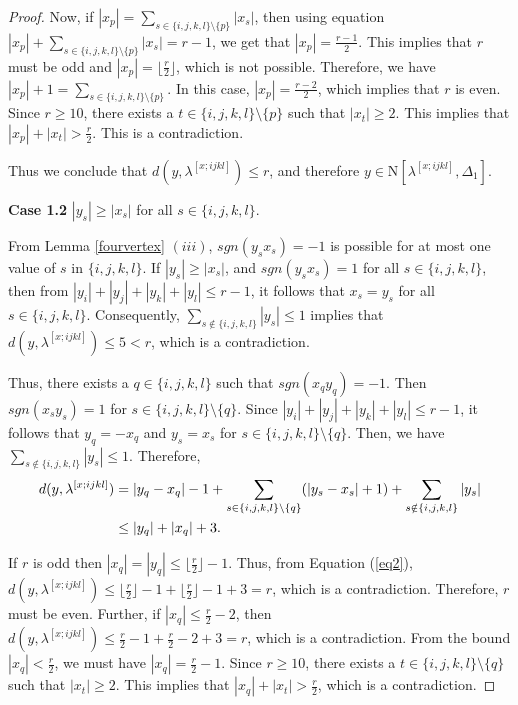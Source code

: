 \documentclass{amsart}
\theoremstyle{definition}
\theoremstyle{remark}
\numberwithin{equation}{section}
\newcommand{\D}{\Delta}
\newcommand{\f}{\lfloor\frac{r}{2}\rfloor}
\def\n{{\mathrm{N}}}
\begin{document}
\begin{proof}
	Now, if $|x_p|=\sum_{s \in \{i, j, k, l\}\setminus \{p\}} |x_s|$, then using equation $|x_p|+\sum_{s \in \{i, j, k, l\}\setminus \{p\}} |x_s| =r-1$, we get that $|x_p|=\frac{r-1}{2}$. This implies that $r$ must be odd and $|x_p|=\f$, which is not possible. 
	Therefore, we have $|x_p|+1=\sum_{s \in \{i, j, k, l\}\setminus \{p\}}$. In this case, $|x_p|=\frac{r-2}{2}$, which implies that $r$ is even. Since $r\geq 10$, there exists a $t\in \{i, j, k, l\}\setminus \{p\}$ such that $|x_t|\geq 2$. This implies that $|x_p|+|x_t|>\frac{r}{2}$. This is a contradiction.
	
	Thus we conclude that $d(y, \lambda^{[x;ijkl]}) \leq r$, and therefore $y \in \n[\lambda^{[x;ijkl]}, \D_1]$.
	

    \smallskip
	\noindent 
	\textbf{Case 1.2} $|y_s|\geq |x_s|$ for all $s\in\{i,j,k,l\}$. 
	
	
	From Lemma \ref{fourvertex} $(iii)$, $sgn(y_sx_s)=-1$ is possible for at most one value of $s$ in $\{i,j,k,l\}$. 
	If $|y_s|\geq |x_s|$, and $sgn(y_sx_s)=1$ for all $s\in \{i,j,k, l\}$, then from $|y_i|+|y_j|+|y_k|+|y_l|\leq r-1$, it follows that $x_s=y_s$ for all $s\in \{i,j,k,l\}$. Consequently, $\sum_{s\notin\{i,j,k,l\}}|y_s|\leq 1$ implies that $d(y,\lambda^{[x;ijkl]})\leq 5<r$, which is a contradiction.  
	
	Thus, there exists a $q\in\{i,j,k,l\}$ such that $sgn(x_qy_q)=-1$. Then $sgn(x_sy_s)=1$ for $s\in\{i,j,k,l\}\setminus\{q\}$. Since $|y_i|+|y_j|+|y_k|+|y_l|\leq r-1$, it follows that $y_q=-x_q$ and $y_s=x_s$ for $s\in\{i,j,k,l\}\setminus\{q\}$. Then, we have $\sum_{s\notin\{i,j,k,l\}}|y_s|\leq 1$. Therefore, 
	\begin{align}
		d(y,\lambda^{[x;ijkl]})&=|y_q-x_q|-1+\sum_{s\in\{i,j,k,l\}\setminus\{q\}}(|y_s-x_s|+1)+\sum_{s\notin\{i,j,k,l\}}|y_s| \notag
		\\
		&\leq |y_q|+|x_q|+3. \label{eq2}
	\end{align}
	
	If $r$ is odd then $|x_q|=|y_q|\leq \f-1$. Thus, from Equation (\ref{eq2}),
	$d(y,\lambda^{[x;ijkl]})\leq \f-1+\f-1+3=r$, which is a contradiction.  Therefore, $r$ must be even. 
	Further, if $|x_q|\leq \frac{r}{2}-2$, then  $d(y,\lambda^{[x;ijkl]})\leq \frac{r}{2}-1+\frac{r}{2}-2+3=r$, which is a contradiction. From the bound  $|x_q|<\frac{r}{2}$, we must have $|x_q|=\frac{r}{2}-1$. Since $r\geq 10$, there exists a $t\in \{i, j, k, l\}\setminus \{q\}$ such that $|x_t|\geq 2$. This implies that $|x_q|+|x_t|>\frac{r}{2}$, which is a contradiction.
	

\end{proof}
\end{document}
